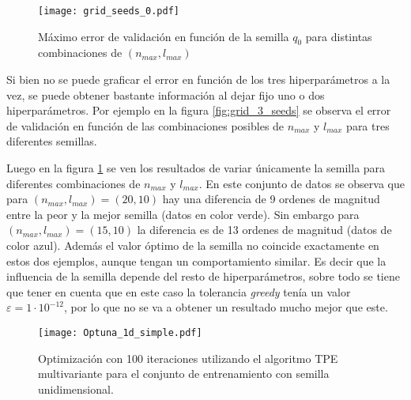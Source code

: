 \begin{figure}[h!]
\centering
\texttt{[image: grid\_seeds\_0.pdf]}
\caption{Máximo error de validación en función de la semilla $q_0$ para distintas combinaciones de $(n_{max}, l_{max})$}
\label{fig:grid_seed_0}
\end{figure}


 


Si bien no se puede graficar el error en función de los tres hiperparámetros a la vez, se puede obtener bastante información al dejar fijo uno o dos hiperparámetros. Por ejemplo en la figura \ref{fig:grid_3_seeds} se observa el error de validación en función de las combinaciones posibles de  $n_{max}$ y $l_{max}$ para tres diferentes semillas. 

Luego en la figura \ref{fig:grid_seed_0} se ven los resultados de variar únicamente la semilla para diferentes combinaciones de $n_{max}$ y $l_{max}$. 
En este conjunto de datos se observa que para $(n_{max}, l_{max})=(20, 10)$ hay una diferencia de 9 ordenes de magnitud entre la peor y la mejor semilla (datos en color verde). Sin embargo para $(n_{max}, l_{max})=(15, 10)$ la diferencia es de 13 ordenes de magnitud (datos de color azul). Además el valor óptimo de la semilla no coincide exactamente en estos dos ejemplos, aunque tengan un comportamiento similar. Es decir que la influencia de la semilla depende del resto de hiperparámetros, sobre todo se tiene que tener en cuenta que en este caso la tolerancia \textit{greedy} tenía un valor $\varepsilon = 1\cdot 10^{-12}$, por lo que no se va a obtener un resultado mucho mejor que este.

\begin{figure}[h!]
\centering
\texttt{[image: Optuna\_1d\_simple.pdf]}
\caption{Optimización con 100 iteraciones utilizando el algoritmo TPE multivariante para el conjunto de entrenamiento con semilla unidimensional.}
\label{fig:optuna_1d}
\end{figure}

